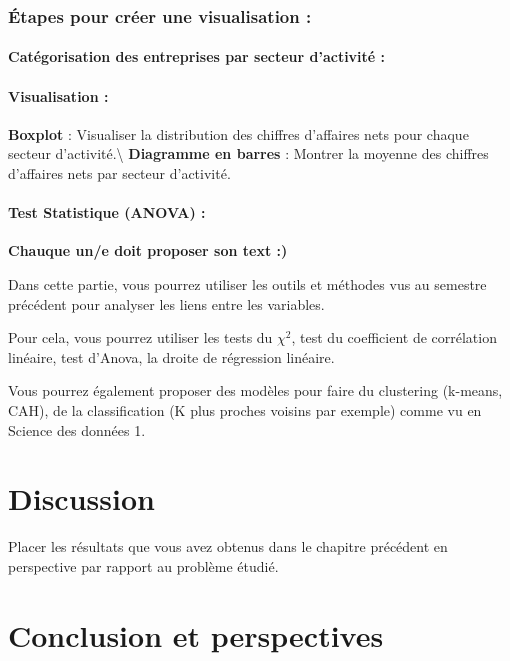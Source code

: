 \documentclass[mstat,12pt]{unswthesis}
\begin{document}
\subsection{Étapes pour créer une visualisation
:}\label{uxe9tapes-pour-cruxe9er-une-visualisation}

\subsubsection{Catégorisation des entreprises par secteur d'activité
:}\label{catuxe9gorisation-des-entreprises-par-secteur-dactivituxe9}

\subsubsection{Visualisation :}\label{visualisation}

\textbf{Boxplot} : Visualiser la distribution des chiffres d'affaires
nets pour chaque secteur d'activité.\textbackslash{} \textbf{Diagramme
en barres} : Montrer la moyenne des chiffres d'affaires nets par secteur
d'activité.

\subsubsection{Test Statistique (ANOVA)
:}\label{test-statistique-anova-1}

\textbf{Chauque un/e doit proposer son text :) }

Dans cette partie, vous pourrez utiliser les outils et méthodes vus au
semestre précédent pour analyser les liens entre les variables.

Pour cela, vous pourrez utiliser les tests du \(\chi^2\), test du
coefficient de corrélation linéaire, test d'Anova, la droite de
régression linéaire.

Vous pourrez également proposer des modèles pour faire du clustering
(k-means, CAH), de la classification (K plus proches voisins par
exemple) comme vu en Science des données 1.

\newpage

\chapter{Discussion}\label{discussion}

Placer les résultats que vous avez obtenus dans le chapitre précédent en
perspective par rapport au problème étudié.

\chapter{Conclusion et perspectives}\label{conclusion-et-perspectives}
\end{document}

